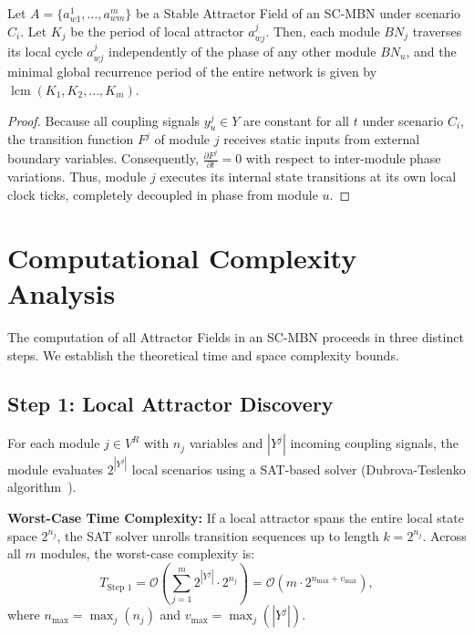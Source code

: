 \documentclass{svproc}
\begin{document}
\begin{theorem}
Let $A = \{a_{w1}^1, \dots, a_{wm}^m\}$ be a Stable Attractor Field of an SC-MBN under scenario $C_i$. Let $K_j$ be the period of local attractor $a_{wj}^j$. Then, each module $BN_j$ traverses its local cycle $a_{wj}^j$ independently of the phase of any other module $BN_u$, and the minimal global recurrence period of the entire network is given by $\operatorname{lcm}(K_1, K_2, \dots, K_m)$.
\end{theorem}
\begin{proof}
Because all coupling signals $y_u^j \in Y$ are constant for all $t$ under scenario $C_i$, the transition function $F^j$ of module $j$ receives static inputs from external boundary variables. Consequently, $\frac{\partial F^j}{\partial t} = 0$ with respect to inter-module phase variations. Thus, module $j$ executes its internal state transitions at its own local clock ticks, completely decoupled in phase from module $u$.
\end{proof}

\section{Computational Complexity Analysis}

The computation of all Attractor Fields in an SC-MBN proceeds in three distinct steps. We establish the theoretical time and space complexity bounds.

\subsection{Step 1: Local Attractor Discovery}
For each module $j \in V^R$ with $n_j$ variables and $|Y^j|$ incoming coupling signals, the module evaluates $2^{|Y^j|}$ local scenarios using a SAT-based solver (Dubrova-Teslenko algorithm~\cite{dubrova2011sat}).

\textbf{Worst-Case Time Complexity:} If a local attractor spans the entire local state space $2^{n_j}$, the SAT solver unrolls transition sequences up to length $k = 2^{n_j}$. Across all $m$ modules, the worst-case complexity is:
\begin{equation}
    T_{\text{Step 1}} = \mathcal{O}\left(\sum_{j=1}^m 2^{|Y^j|} \cdot 2^{n_j}\right) = \mathcal{O}\left(m \cdot 2^{n_{\max} + v_{\max}}\right),
\end{equation}
where $n_{\max} = \max_j(n_j)$ and $v_{\max} = \max_j(|Y^j|)$.
\end{document}
